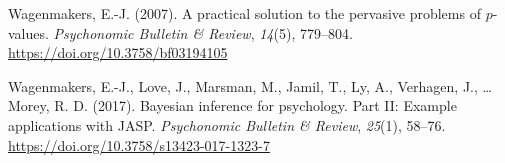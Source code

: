 \documentclass[doc]{apa6}
\begin{document}
\leavevmode\hypertarget{ref-wagenmakers2007}{}%
Wagenmakers, E.-J. (2007). A practical solution to the pervasive problems of \(p\)- values. \emph{Psychonomic Bulletin \& Review}, \emph{14}(5), 779--804. \url{https://doi.org/10.3758/bf03194105}

\leavevmode\hypertarget{ref-wagenmakers2017}{}%
Wagenmakers, E.-J., Love, J., Marsman, M., Jamil, T., Ly, A., Verhagen, J., \ldots{} Morey, R. D. (2017). Bayesian inference for psychology. Part II: Example applications with JASP. \emph{Psychonomic Bulletin \& Review}, \emph{25}(1), 58--76. \url{https://doi.org/10.3758/s13423-017-1323-7}
\end{document}
